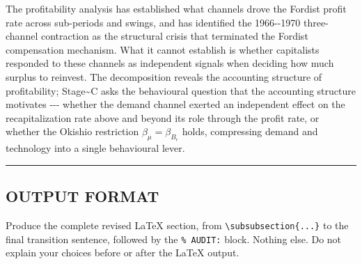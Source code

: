 The profitability analysis has established what channels drove the
Fordist profit rate across sub-periods and swings, and has identified
the 1966-\/-1970 three-channel contraction as the structural crisis that
terminated the Fordist compensation mechanism. What it cannot establish
is whether capitalists responded to these channels as independent
signals when deciding how much surplus to reinvest. The decomposition
reveals the accounting structure of profitability;
Stage\textasciitilde C asks the behavioural question that the accounting
structure motivates -\/-\/- whether the demand channel exerted an
independent effect on the recapitalization rate above and beyond its
role through the profit rate, or whether the Okishio restriction
\(\beta_{\mu} = \beta_{B_{r}}\) holds, compressing demand and technology
into a single behavioural lever.

\begin{center}\rule{0.5\linewidth}{0.5pt}\end{center}

\subsection{OUTPUT FORMAT}\label{output-format}

Produce the complete revised LaTeX section, from
\texttt{\textbackslash{}subsubsection\{...\}} to the final transition
sentence, followed by the \texttt{\%\ AUDIT:} block. Nothing else. Do
not explain your choices before or after the LaTeX output.
